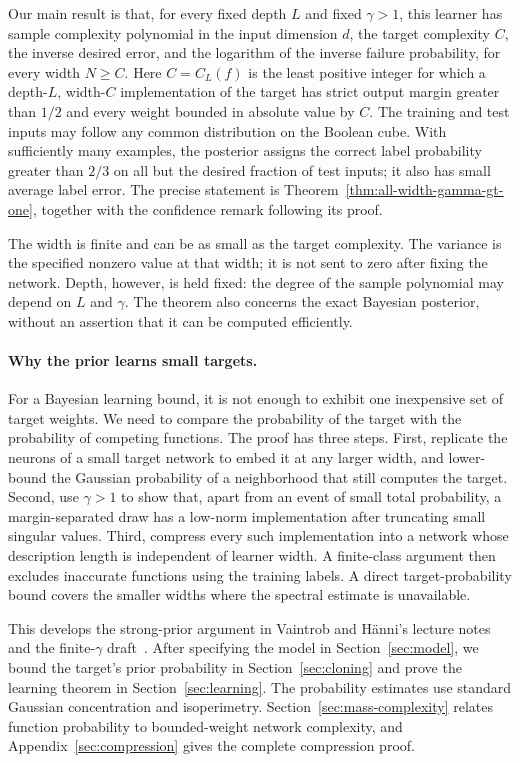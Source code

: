 \documentclass[11pt]{article}
\theoremstyle{definition}
\begin{document}
Our main result is that, for every fixed depth $L$ and fixed $\gamma>1$,
this learner has sample complexity polynomial in the input dimension $d$,
the target complexity $C$, the inverse desired error, and the logarithm of
the inverse failure probability, for every width $N\geq C$.
Here $C=C_L(f)$ is the least positive integer for which a depth-$L$,
width-$C$ implementation of the target has strict output margin greater
than $1/2$ and every weight bounded in absolute value by $C$.
The training and test inputs may follow any common
distribution on the Boolean cube. With sufficiently many examples, the
posterior assigns the correct label probability greater than $2/3$ on all
but the desired fraction of test inputs; it also has small average label
error. The precise statement is Theorem~\ref{thm:all-width-gamma-gt-one}, together
with the confidence remark following its proof.

The width is finite and can be as small as the target complexity. The
variance is the specified nonzero value at that width; it is not sent to
zero after fixing the network. Depth, however, is held fixed: the degree of
the sample polynomial may depend on $L$ and $\gamma$. The theorem also
concerns the exact Bayesian posterior, without an assertion that it can be
computed efficiently.

\paragraph{Why the prior learns small targets.}
For a Bayesian learning bound, it is not enough to exhibit one inexpensive
set of target weights. We need to compare the probability of the target
with the probability of competing functions. The proof has three steps.
First, replicate the neurons of a small target network to embed it at any
larger width, and lower-bound the Gaussian probability of a neighborhood
that still computes the target. Second, use $\gamma>1$ to show that, apart
from an event of small total probability, a margin-separated draw has a
low-norm implementation after truncating small singular values. Third,
compress every such implementation into a network whose description length
is independent of learner width. A finite-class argument then excludes
inaccurate functions using the training labels. A direct target-probability
bound covers the smaller widths where the spectral estimate is unavailable.

This develops the strong-prior argument in Vaintrob and H\"anni's lecture
notes~\cite{notes} and the finite-$\gamma$ draft~\cite{fable}. After specifying
the model in Section~\ref{sec:model}, we bound the target's prior probability
in Section~\ref{sec:cloning} and prove the learning theorem in
Section~\ref{sec:learning}. The probability estimates use standard Gaussian
concentration and isoperimetry. Section~\ref{sec:mass-complexity} relates
function probability to bounded-weight network complexity, and
Appendix~\ref{sec:compression} gives the complete compression proof.
\end{document}
